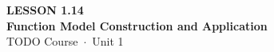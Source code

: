 \documentclass[aspectratio=169, 11pt]{beamer}
\begin{document}
{
\begin{frame}[plain]
  \vspace{2.8cm}\hspace{0.55cm}%
  \begin{minipage}{0.9\textwidth}
    {\color{goldacc}\bfseries\small LESSON 1.14}\\[0.5cm]
    {\color{white}\bfseries\LARGE Function Model Construction and Application}\\[1.2cm]
    {\color{skymid}\small TODO Course~$\cdot$~Unit 1}
  \end{minipage}
\end{frame}
}

\begin{frame}[t, plain]
\end{frame}
\end{document}

